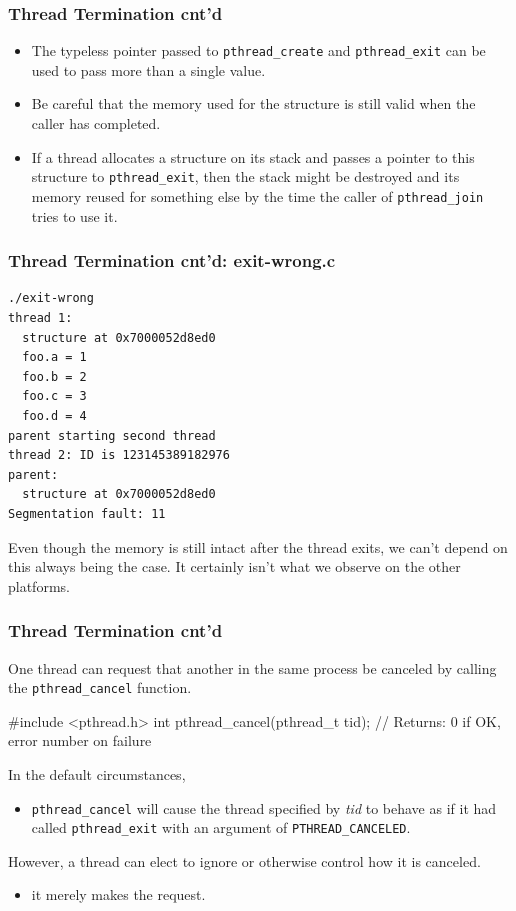 \documentclass[newPxFont,sthlmFooter,nooffset]{beamer}
\begin{document}
\begin{frame}[t]
  \frametitle{Thread Termination cnt'd}
  \begin{itemize}
  \item The typeless pointer passed to \texttt{pthread\_create} and
    \texttt{pthread\_exit} can be used to pass more than a single
    value.
  \item Be careful that the memory used for the structure is still
    valid when the caller has completed.
  \item If a thread allocates a structure on its stack and passes a
    pointer to this structure to \texttt{pthread\_exit}, then the
    stack might be destroyed and its memory reused for something else
    by the time the caller of \texttt{pthread\_join} tries to use it.
  \end{itemize}

\end{frame}

\begin{frame}
  \frametitle{Thread Termination cnt'd: exit-wrong.c}



\begin{verbatim}
./exit-wrong
thread 1:
  structure at 0x7000052d8ed0
  foo.a = 1
  foo.b = 2
  foo.c = 3
  foo.d = 4
parent starting second thread
thread 2: ID is 123145389182976
parent:
  structure at 0x7000052d8ed0
Segmentation fault: 11
\end{verbatim}

Even though the memory is still intact after the thread exits, we can’t depend on this always being the case. It certainly isn’t what we observe on the other platforms.
\end{frame}


\begin{frame}[fragile,t]
  \frametitle{Thread Termination cnt'd}
One thread can request that another in the same process be canceled by calling the \texttt{pthread\_cancel} function.

\begin{codedef}
#include <pthread.h>
int pthread_cancel(pthread_t tid);
// Returns: 0 if OK, error number on failure
\end{codedef}

In the default circumstances,
\begin{itemize}
\item \texttt{pthread\_cancel} will cause the thread specified by
  \textit{tid} to behave as if it had called \texttt{pthread\_exit}
  with an argument of \texttt{PTHREAD\_CANCELED}.
\end{itemize}

However, a thread can elect to ignore or otherwise control how it is canceled.
\begin{itemize}
\item it merely makes the request.
\end{itemize}

\end{frame}
\end{document}
